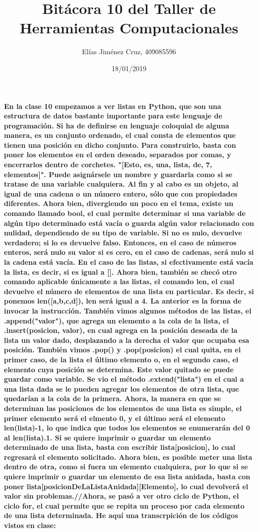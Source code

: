 \documentclass[letterpaper, 12pt, oneside]{article} %
\title{\Huge Bitácora 10 del Taller de Herramientas Computacionales}
\author{Elías Jiménez Cruz, 409085596}
\date{18/01/2019}
\begin{document}
	\maketitle
	\paragraph{En la clase 10 empezamos a ver listas en Python, que son una estructura de datos bastante importante para este lenguaje de programación. Si ha de definirse en lenguaje coloquial de alguna manera, es un conjunto ordenado, el cual consta de elementos que tienen una posición en dicho conjunto. Para construirlo, basta con poner los elementos en el orden deseado, separados por comas, y encerrarlos dentro de corchetes. "[Esto, es, una, lista, de, 7, elementos]". Puede asignársele un nombre y guardarla como si se tratase de una variable cualquiera. Al fin y al cabo es un objeto, al igual de una cadena o un número entero, sólo que con propiedades diferentes. Ahora bien, divergiendo un poco en el tema, existe un comando llamado bool, el cual permite determinar si una variable de algún tipo determinado está vacía o guarda algún valor relacionado con nulidad, dependiendo de su tipo de variable. Si no es nulo, devuelve verdadero; si lo es devuelve falso. Entonces, en el caso de números enteros, será nulo su valor si es cero, en el caso de cadenas, será nulo si la cadena está vacía. En el caso de las listas, si efectivamente está vacía la lista, es decir, si es igual a []. Ahora bien, también se checó otro comando aplicable únicamente a las listas, el comando len, el cual devuelve el número de elementos de una lista en particular. Es decir, si ponemos len([a,b,c,d]), len será igual a 4. La anterior es la forma de invocar la instrucción. También vimos algunos métodos de las listas, el .append("valor"), que agrega un elemento a la cola de la lista, el .insert(posicion, valor), en cual agrega en la posición deseada de la lista un valor dado, desplazando a la derecha el valor que ocupaba esa posición. También vimos .pop() y .pop(posicion) el cual quita, en el primer caso, de la lista el último elemento o, en el segundo caso, el elemento cuya posición se determina. Este valor quitado se puede guardar como variable. Se vio el método .extend("lista") en el cual a una lista dada se le pueden agregar los elementos de otra lista, que quedarían a la cola de la primera. Ahora, la manera en que se determinan las posiciones de los elementos de una lista es simple, el primer elemento será el elmento 0, y el último será el elemento len(lista)-1, lo que indica que todos los elementos se enumerarán del 0 al len(lista).1. Si se quiere imprimir o guardar un elemento determinado de una lista, basta con escribir lista[posicion], lo cual regresará el elemento solicitado. Ahora bien, es posible meter una lista dentro de otra, como si fuera un elemento cualquiera, por lo que si se quiere imprimir o guardar un elemento de esa lista anidada, basta con poner lista[posicionDeLaListaAnidada][Elemento], lo cual devolverá el valor sin problemas.//Ahora, se pasó a ver otro ciclo de Python, el ciclo for, el cual permite que se repita un proceso por cada elemento de una lista determinada. He aquí una transcrpición de los códigos vistos en clase:}
\end{document}
